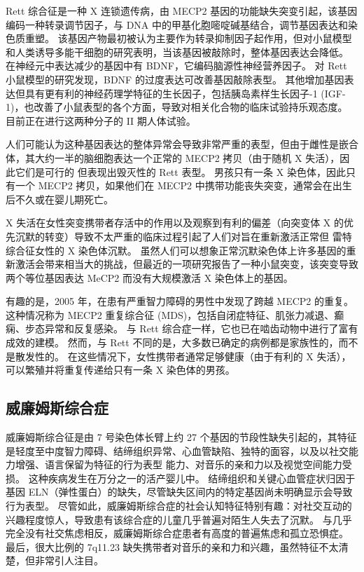 Rett 综合征是一种 X 连锁遗传病，由 MECP2 基因的功能缺失突变引起，该基因编码一种转录调节因子，与 DNA 中的甲基化胞嘧啶碱基结合，调节基因表达和染色质重塑。
该基因产物最初被认为主要作为转录抑制因子起作用，但对小鼠模型和人类诱导多能干细胞的研究表明，当该基因被敲除时，整体基因表达会降低。
在神经元中表达减少的基因中有 BDNF，它编码脑源性神经营养因子。
对 Rett 小鼠模型的研究发现，BDNF 的过度表达可改善基因敲除表型。
其他增加基因表达但具有更有利的神经药理学特征的生长因子，包括胰岛素样生长因子-1 (IGF-1)，也改善了小鼠表型的各个方面，导致对相关化合物的临床试验持乐观态度。
目前正在进行这两种分子的 II 期人体试验。


人们可能认为这种基因表达的整体异常会导致非常严重的表型，但由于雌性是嵌合体，其大约一半的脑细胞表达一个正常的 MECP2 拷贝（由于随机 X 失活），因此它们是可行的 但表现出毁灭性的 Rett 表型。
男孩只有一条 X 染色体，因此只有一个 MECP2 拷贝，如果他们在 MECP2 中携带功能丧失突变，通常会在出生后不久或在婴儿期死亡。


X 失活在女性突变携带者存活中的作用以及观察到有利的偏差（向突变体 X 的优先沉默的转变）导致不太严重的临床过程引起了人们对旨在重新激活正常但 雷特综合征女性的 X 染色体沉默。
虽然人们可以想象正常沉默染色体上许多基因的重新激活会带来相当大的挑战，但最近的一项研究报告了一种小鼠突变，该突变导致两个等位基因表达 MeCP2 而没有大规模激活 X 染色体上的基因。


有趣的是，2005 年，在患有严重智力障碍的男性中发现了跨越 MECP2 的重复。
这种情况称为 MECP2 重复综合征 (MDS)，包括自闭症特征、肌张力减退、癫痫、步态异常和反复感染。
与 Rett 综合症一样，它也已在啮齿动物中进行了富有成效的建模。
然而，与 Rett 不同的是，大多数已确定的病例都是家族性的，而不是散发性的。
在这些情况下，女性携带者通常足够健康（由于有利的 X 失活），可以繁殖并将重复传递给只有一条 X 染色体的男孩。



\subsection{威廉姆斯综合症}

威廉姆斯综合征是由 7 号染色体长臂上约 27 个基因的节段性缺失引起的，其特征是轻度至中度智力障碍、结缔组织异常、心血管缺陷、独特的面容，以及以社交能力增强、语言保留为特征的行为表型 能力、对音乐的亲和力以及视觉空间能力受损。
这种疾病发生在万分之一的活产婴儿中。 结缔组织和关键心血管症状归因于基因 ELN（弹性蛋白）的缺失，尽管缺失区间内的特定基因尚未明确显示会导致行为表型。 尽管如此，威廉姆斯综合症的社会认知特征特别有趣：对社交互动的兴趣程度惊人，导致患有该综合症的儿童几乎普遍对陌生人失去了沉默。
与几乎完全没有社交焦虑相反，威廉姆斯综合症患者有高度的普遍焦虑和孤立恐惧症。
最后，很大比例的 7q11.23 缺失携带者对音乐的亲和力和兴趣，虽然特征不太清楚，但非常引人注目。


